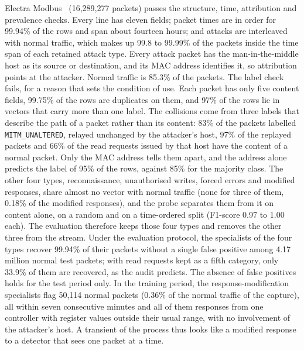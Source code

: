 Electra Modbus~\cite{perales2019electra} (16{,}289{,}277 packets) passes the structure,
time, attribution and prevalence checks. Every line has eleven fields; packet times are in
order for 99.94\% of the rows and span about fourteen hours; and attacks are interleaved
with normal traffic, which makes up 99.8 to 99.99\% of the packets inside the time span of
each retained attack type. Every attack packet has the man-in-the-middle host as its source
or destination, and its MAC address identifies it, so attribution points at the attacker. Normal traffic is 85.3\% of the packets. The label check fails, for a reason
that sets the condition of use. Each packet has only five content fields, 99.75\% of the
rows are duplicates on them, and 97\% of the rows lie in vectors that carry more than one
label. The collisions come from three labels that describe the path of a packet rather
than its content: 83\% of the packets labelled \texttt{MITM\_UNALTERED}, relayed unchanged
by the attacker's host, 97\% of the replayed packets and 66\% of the read requests issued
by that host have the content of a normal packet. Only the MAC address tells them apart,
and the address alone predicts the label of 95\% of the rows, against 85\% for the
majority class. The other four types, reconnaissance, unauthorised writes, forced errors
and modified responses, share almost no vector with normal traffic (none for three of
them, 0.18\% of the modified responses), and the probe separates them from it on content alone, on a
random and on a time-ordered split (F1-score 0.97 to 1.00 each). The evaluation therefore
keeps those four types and removes the other three from the stream. Under the evaluation
protocol, the specialists of the four types recover 99.94\% of their packets without a
single false positive among 4.17 million normal test packets; with read requests kept as a
fifth category, only 33.9\% of them are recovered, as the audit predicts. The absence of
false positives holds for the test period only. In the training period, the
response-modification specialists flag 50{,}114 normal packets (0.36\% of the normal
traffic of the capture), all within seven consecutive minutes and all of them responses
from one controller with register values outside their usual range, with no involvement of
the attacker's host. A transient of the process thus looks like a modified response to a
detector that sees one packet at a time.

